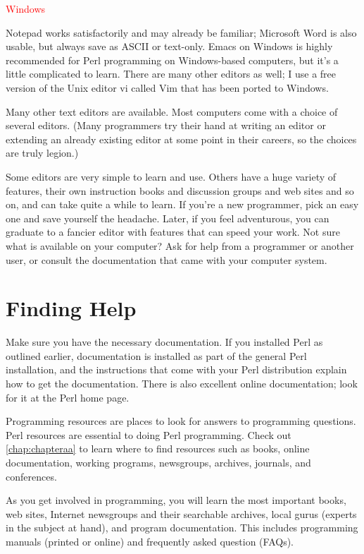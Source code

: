 \textcolor{red}{Windows}
\begin{adjustwidth}{2em}{}
Notepad works satisfactorily and may already be familiar; Microsoft Word is also usable, but always save as ASCII or text-only. Emacs on Windows is highly recommended for Perl programming on Windows-based computers, but it's a little complicated to learn. There are many other editors as well; I use a free version of the Unix editor vi called Vim that has been ported to Windows.
\end{adjustwidth}

Many other text editors are available. Most computers come with a choice of several editors. (Many programmers try their hand at writing an editor or extending an already existing editor at some point in their careers, so the choices are truly legion.)

Some editors are very simple to learn and use. Others have a huge variety of features, their own instruction books and discussion groups and web sites and so on, and can take quite a while to learn. If you're a new programmer, pick an easy one and save yourself the headache. Later, if you feel adventurous, you can graduate to a fancier editor with features that can speed your work. Not sure what is available on your computer? Ask for help from a programmer or another user, or consult the documentation that came with your computer system. 

\section{Finding Help}
Make sure you have the necessary documentation. If you installed Perl as outlined earlier, documentation is installed as part of the general Perl installation, and the instructions that come with your Perl distribution explain how to get the documentation. There is also excellent online documentation; look for it at the Perl home page.

Programming resources are places to look for answers to programming questions. Perl resources are essential to doing Perl programming. Check out \autoref{chap:chapteraa} to learn where to find resources such as books, online documentation, working programs, newsgroups, archives, journals, and conferences.

As you get involved in programming, you will learn the most important books, web sites, Internet newsgroups and their searchable archives, local gurus (experts in the subject at hand), and program documentation. This includes programming manuals (printed or online) and frequently asked question (FAQs).

